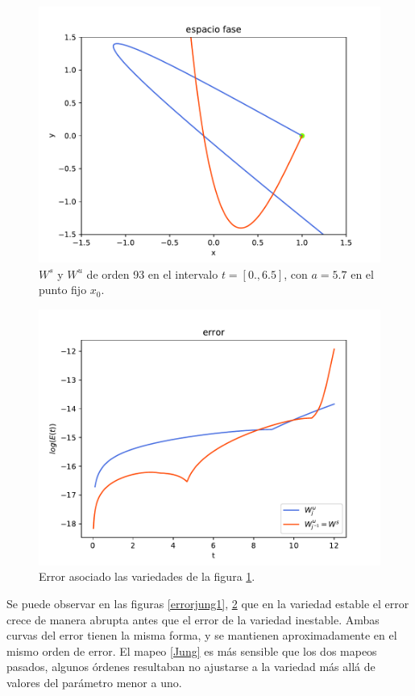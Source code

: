 \begin{figure}[H]
\centering
\includegraphics[scale=0.7]{jung57}
\caption{$W^{s}$ y $W^{u}$ de orden 93 en el intervalo $t=[0.,6.5]$, con $a=5.7$ en el punto fijo $x_{0}$.}
\label{jung2}
\end{figure}


\begin{figure}[H]
\centering
\includegraphics[scale=0.7]{error_jung57}
\caption{Error asociado las variedades de la figura \ref{jung2}.}
\label{errorjung2}
\end{figure}
Se puede observar en las figuras \ref{errorjung1}, \ref{errorjung2} que en la variedad estable el error crece de manera abrupta antes que el error de la variedad inestable. Ambas curvas del error tienen la misma forma, y se mantienen aproximadamente en el mismo orden de error. El mapeo \eqref{Jung} es más sensible que los dos mapeos pasados, algunos órdenes resultaban no ajustarse a la variedad más allá de valores del parámetro menor a uno.\\




